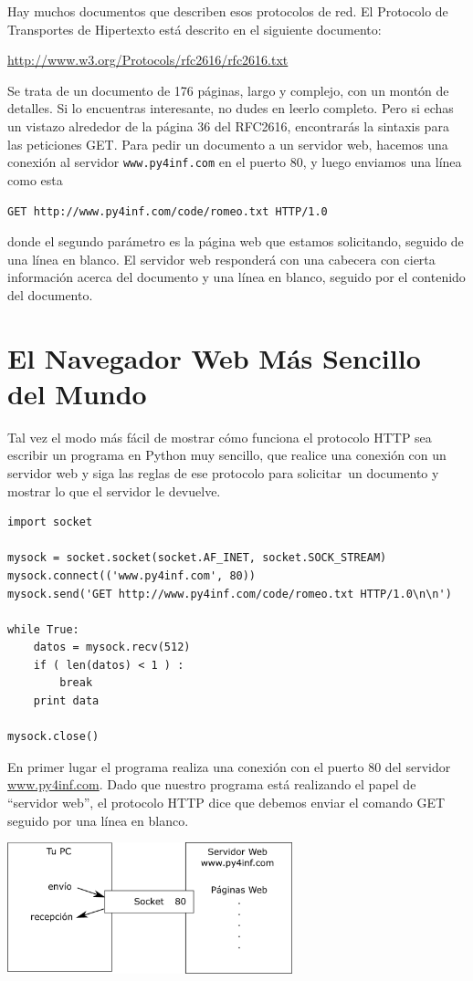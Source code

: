 Hay muchos documentos que describen esos protocolos de red. El Protocolo de Transportes de
Hipertexto está descrito en el siguiente documento:

\url{http://www.w3.org/Protocols/rfc2616/rfc2616.txt}

Se trata de un documento de 176 páginas, largo y complejo, con un montón de detalles. Si lo
encuentras interesante, no dudes en leerlo completo. Pero si echas un vistazo alrededor de la
página 36 del RFC2616, encontrarás la sintaxis para las peticiones GET. Para pedir un documento a un
servidor web, hacemos una conexión al servidor {\tt www.py4inf.com} en el puerto 80, y luego
enviamos una línea como esta

{\tt GET http://www.py4inf.com/code/romeo.txt HTTP/1.0 }

donde el segundo parámetro es la página web que estamos solicitando, seguido
de una línea en blanco. El servidor web responderá con una cabecera con cierta
información acerca del documento y una línea en blanco,
seguido por el contenido del documento.

\section{El Navegador Web Más Sencillo del Mundo}

Tal vez el modo más fácil de mostrar cómo funciona el protocolo HTTP sea escribir un
programa en Python muy sencillo, que realice una conexión con un servidor web y siga
las reglas de ese protocolo para solicitar\ un documento
y mostrar lo que el servidor le devuelve.

\beforeverb
\begin{verbatim}
import socket

mysock = socket.socket(socket.AF_INET, socket.SOCK_STREAM)
mysock.connect(('www.py4inf.com', 80))
mysock.send('GET http://www.py4inf.com/code/romeo.txt HTTP/1.0\n\n')

while True:
    datos = mysock.recv(512)
    if ( len(datos) < 1 ) :
        break
    print data

mysock.close()
\end{verbatim}
\afterverb
%
En primer lugar el programa realiza una conexión con el puerto 80 del
servidor \url{www.py4inf.com}.
Dado que nuestro programa está realizando el papel de ``servidor web'', el
protocolo HTTP dice que debemos enviar el comando GET seguido por una línea en blanco.

\beforefig
\centerline{\includegraphics[height=1.50in]{figs2/socket.eps}}
\afterfig

